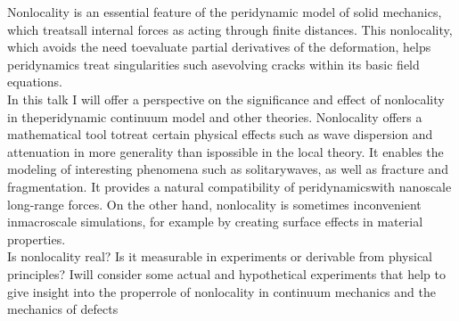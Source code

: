Nonlocality is an essential feature of the peridynamic model of solid mechanics, which treatsall internal forces as acting through finite distances. This nonlocality, which avoids the need toevaluate partial derivatives of the deformation, helps peridynamics treat singularities such asevolving cracks within its basic field equations.\\

In this talk I will offer a perspective on the significance and effect of nonlocality in theperidynamic continuum model and other theories. Nonlocality offers a mathematical tool totreat certain physical effects such as wave dispersion and attenuation in more generality than ispossible in the local theory. It enables the modeling of interesting phenomena such as solitarywaves, as well as fracture and fragmentation. It provides a natural compatibility of peridynamicswith nanoscale long-range forces. On the other hand, nonlocality is sometimes inconvenient inmacroscale simulations, for example by creating surface effects in material properties.\\

Is nonlocality real? Is it measurable in experiments or derivable from physical principles? Iwill consider some actual and hypothetical experiments that help to give insight into the properrole of nonlocality in continuum mechanics and the mechanics of defects